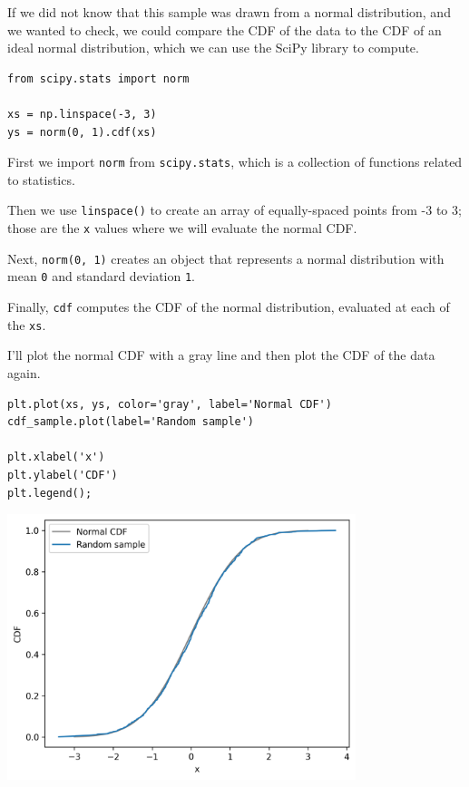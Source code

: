 If we did not know that this sample was drawn from a normal
distribution, and we wanted to check, we could compare the CDF of the
data to the CDF of an ideal normal distribution, which we can use the
SciPy library to compute.

\begin{lstlisting}[]
from scipy.stats import norm

xs = np.linspace(-3, 3)
ys = norm(0, 1).cdf(xs)
\end{lstlisting}

First we import \passthrough{\lstinline!norm!} from
\passthrough{\lstinline!scipy.stats!}, which is a collection of
functions related to statistics.

Then we use \passthrough{\lstinline!linspace()!} to create an array of
equally-spaced points from -3 to 3; those are the
\passthrough{\lstinline!x!} values where we will evaluate the normal
CDF.

Next, \passthrough{\lstinline!norm(0, 1)!} creates an object that
represents a normal distribution with mean \passthrough{\lstinline!0!}
and standard deviation \passthrough{\lstinline!1!}.

Finally, \passthrough{\lstinline!cdf!} computes the CDF of the normal
distribution, evaluated at each of the \passthrough{\lstinline!xs!}.

I'll plot the normal CDF with a gray line and then plot the CDF of the
data again.

\begin{lstlisting}[]
plt.plot(xs, ys, color='gray', label='Normal CDF')
cdf_sample.plot(label='Random sample')

plt.xlabel('x')
plt.ylabel('CDF')
plt.legend();
\end{lstlisting}

\begin{center}
\includegraphics[width=4in]{chapters/08_distributions_files/08_distributions_113_0.png}
\end{center}


